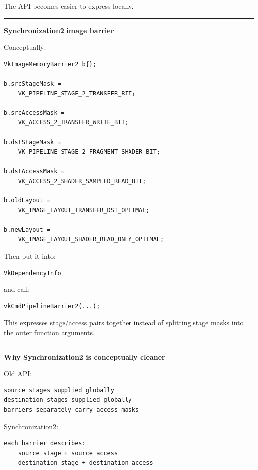 The API becomes easier to express locally.

\begin{center}\rule{0.5\linewidth}{0.5pt}\end{center}

\textbf{Synchronization2 image barrier}

Conceptually:

\begin{verbatim}
VkImageMemoryBarrier2 b{};

b.srcStageMask =
    VK_PIPELINE_STAGE_2_TRANSFER_BIT;

b.srcAccessMask =
    VK_ACCESS_2_TRANSFER_WRITE_BIT;

b.dstStageMask =
    VK_PIPELINE_STAGE_2_FRAGMENT_SHADER_BIT;

b.dstAccessMask =
    VK_ACCESS_2_SHADER_SAMPLED_READ_BIT;

b.oldLayout =
    VK_IMAGE_LAYOUT_TRANSFER_DST_OPTIMAL;

b.newLayout =
    VK_IMAGE_LAYOUT_SHADER_READ_ONLY_OPTIMAL;
\end{verbatim}

Then put it into:

\begin{verbatim}
VkDependencyInfo
\end{verbatim}

and call:

\begin{verbatim}
vkCmdPipelineBarrier2(...);
\end{verbatim}

This expresses stage/access pairs together instead of splitting stage masks into the outer function arguments.

\begin{center}\rule{0.5\linewidth}{0.5pt}\end{center}

\textbf{Why Synchronization2 is conceptually cleaner}

Old API:

\begin{verbatim}
source stages supplied globally
destination stages supplied globally
barriers separately carry access masks
\end{verbatim}

Synchronization2:

\begin{verbatim}
each barrier describes:
    source stage + source access
    destination stage + destination access
\end{verbatim}


